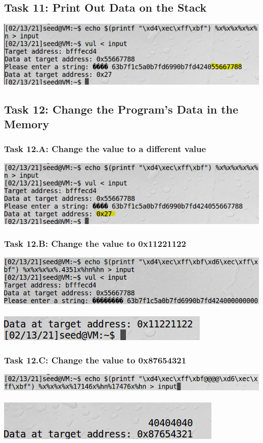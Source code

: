 \documentclass[a4paper]{article}
\begin{document}
\subsection{Task 11: Print Out Data on the Stack}
\includegraphics[scale=0.6]{3/13.png}
\subsection{Task 12: Change the Program’s Data in the Memory}
\subsubsection{Task 12.A: Change the value to a different value}
\includegraphics[scale=0.6]{3/14.png}
\subsubsection{Task 12.B: Change the value to 0x11221122}
\includegraphics[scale=0.8]{3/9.png}\\\\
\includegraphics[scale=0.9]{3/10.png}
\subsubsection{Task 12.C: Change the value to 0x87654321}
\includegraphics[scale=0.8]{3/11.png}\\\\
\includegraphics[scale=0.9]{3/12.png}
\end{document}
